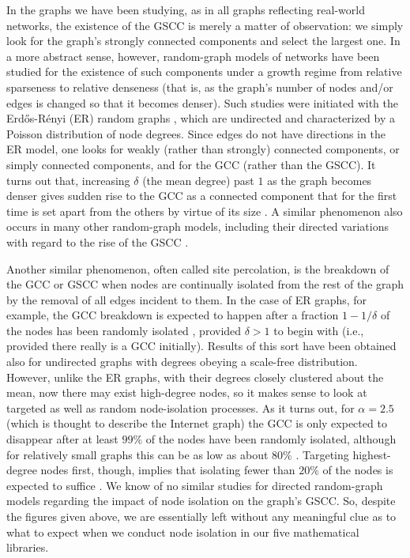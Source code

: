 \documentclass{article}
\begin{document}
In the graphs we have been studying, as in all graphs reflecting real-world
networks, the existence of the GSCC is merely a matter of observation: we simply
look for the graph's strongly connected components and select the largest one.
In a more abstract sense, however, random-graph models of networks have been
studied for the existence of such components under a growth regime from relative
sparseness to relative denseness (that is, as the graph's number of nodes and/or
edges is changed so that it becomes denser). Such studies were initiated with
the Erd\H{o}s-R\'{e}nyi (ER) random graphs \cite{er59}, which are undirected and
characterized by a Poisson distribution of node degrees. Since edges do not have
directions in the ER model, one looks for weakly (rather than strongly)
connected components, or simply connected components, and for the GCC (rather
than the GSCC). It turns out that, increasing $\delta$ (the mean degree) past
$1$ as the graph becomes denser gives sudden rise to the GCC as a connected
component that for the first time is set apart from the others by virtue of its
size \cite{er60}. A similar phenomenon also occurs in many other random-graph
models, including their directed variations with regard to the rise of the GSCC
\cite{k90,mr95,mr98,dms01,nsw01}.

Another similar phenomenon, often called site percolation, is the breakdown of
the GCC or GSCC when nodes are continually isolated from the rest of the graph
by the removal of all edges incident to them. In the case of ER graphs, for
example, the GCC breakdown is expected to happen after a fraction $1-1/\delta$
of the nodes has been randomly isolated \cite{b01}, provided $\delta>1$ to begin
with (i.e., provided there really is a GCC initially). Results of this sort have
been obtained also for undirected graphs with degrees obeying a scale-free
distribution. However, unlike the ER graphs, with their degrees closely
clustered about the mean, now there may exist high-degree nodes, so it makes
sense to look at targeted as well as random node-isolation processes. As it
turns out, for $\alpha=2.5$ (which is thought to describe the Internet graph)
the GCC is only expected to disappear after at least $99\%$ of the nodes have
been randomly isolated, although for relatively small graphs this can be as low
as about $80\%$ \cite{cebh00}. Targeting highest-degree nodes first, though,
implies that isolating fewer than $20\%$ of the nodes is expected to suffice
\cite{ajb00}. We know of no similar studies for directed random-graph models
regarding the impact of node isolation on the graph's GSCC. So, despite the
figures given above, we are essentially left without any meaningful clue as to
what to expect when we conduct node isolation in our five mathematical
libraries.
\end{document}
